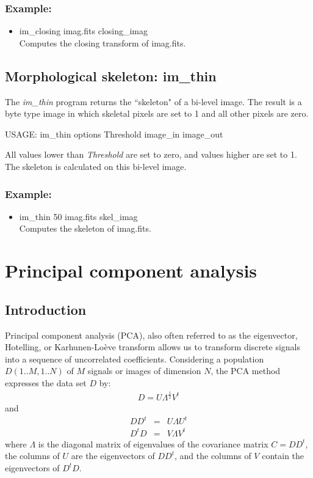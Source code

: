 \subsubsection*{Example:}
\begin{itemize}
\item  im\_closing imag.fits closing\_imag \\
Computes the closing transform of imag.fits.
\end{itemize}

\subsection{Morphological skeleton: im\_thin}
The {\em im\_thin} program returns the ``skeleton" of a bi-level image. 
The result is a byte type image in which skeletal pixels are set to 1
and all other pixels are zero.
{\bf
\begin{center}
USAGE: im\_thin options Threshold image\_in image\_out
\end{center}}
All values lower than {\em Threshold} are set to zero, and values higher are
set to 1. The skeleton is calculated on this bi-level image.
\subsubsection*{Example:}
\begin{itemize}
\item  im\_thin 50 imag.fits skel\_imag \\
Computes the  skeleton of imag.fits.
\end{itemize}

\newpage
\section{Principal component analysis}
\subsection{Introduction}
Principal component analysis (PCA), also often referred to as the 
eigenvector, Hotelling, 
or Karhunen-Lo\`eve transform \cite{ima:karhunen47,ima:loeve48,ima:hotelling33}
allows us to transform  discrete signals into a sequence of uncorrelated 
coefficients. Considering a population $D(1..M,1..N)$ 
of $M$ signals or images of dimension $N$,
the PCA method  expresses the data set $D$ by:
\begin{eqnarray}
D = U \Lambda^{\frac{1}{2}} V^t
\end{eqnarray}
and
\begin{eqnarray}
DD^t & = & U \Lambda U^t \\
D^t D & = & V \Lambda V^t
\end{eqnarray}
where $\Lambda$ is the diagonal matrix of eigenvalues of the covariance 
matrix $C = DD^t$, the columns of $U$ are the eigenvectors of $DD^t$, and 
the columns of $V$ contain the eigenvectors of $D^t D$. 

